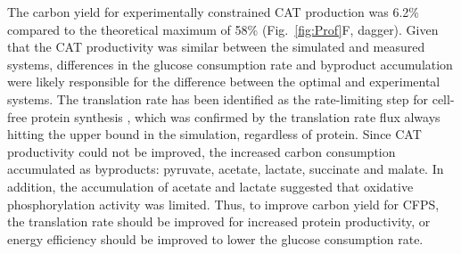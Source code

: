 \documentclass[journal=asbcd6,manuscript=article]{achemso}
\begin{document}
The carbon yield for experimentally constrained CAT production was 6.2\% compared to the theoretical maximum of 58\% (Fig.~\ref{fig:Prof}F, dagger).
Given that the CAT productivity was similar between the simulated and measured systems, differences in the glucose consumption rate and byproduct accumulation were likely responsible for the difference between the optimal and experimental systems.
The translation rate has been identified as the rate-limiting step for cell-free protein synthesis \cite{2005_underwood_biotech,2014_li_PlosOne}, which was confirmed by the translation rate flux always hitting the upper bound in the simulation, regardless of protein.
Since CAT productivity could not be improved, the increased carbon consumption accumulated as byproducts: pyruvate, acetate, lactate, succinate and malate.
In addition, the accumulation of acetate and lactate suggested that oxidative phosphorylation activity was limited.
Thus, to improve carbon yield for CFPS, the translation rate should be improved for increased protein productivity, or energy efficiency should be improved to lower the glucose consumption rate.

\end{document}
